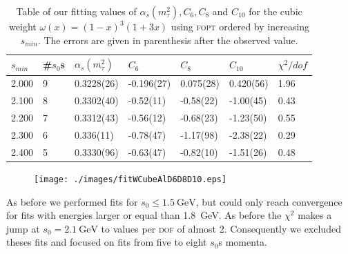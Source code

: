 \documentclass[../../index.tex]{subfiles}
\begin{document}
\begin{table}
  \centering
  \begin{tabular}{lllllll}
    \toprule
    \(s_{min}\) & \#\(s_0\)s & \(\alpha_s(m_\tau^2)\) & \(C_6\) & \(C_8\) & \(C_{10}\) & \(\chi^2/dof\)  \\
    \midrule
    2.000 & 9 & 0.3228(26) & -0.196(27) & 0.075(28) & 0.420(56) & 1.96 \\
    \rowcolor{primary}
    2.100 & 8 & 0.3302(40) & -0.52(11) & -0.58(22) & -1.00(45) & 0.43 \\
    \rowcolor{primary}
    2.200 & 7 & 0.3312(43) & -0.56(12) & -0.68(23) & -1.23(50) & 0.55 \\
    \rowcolor{primary}
    2.300 & 6 & 0.336(11) & -0.78(47) & -1.17(98) & -2.38(22) & 0.29 \\
    \rowcolor{primary}
    2.400 & 5 & 0.3330(96) & -0.63(47) & -0.82(10) & -1.51(26) & 0.48 \\
    \bottomrule
  \end{tabular}
  \caption{Table of our fitting values of \(\alpha_s(m_\tau^2), C_6, C_8\) and
    \(C_{10}\) for the cubic weight \(\omega(x)=(1-x)^3(1+3x)\) using
    \textsc{fopt} ordered by increasing \(s_{min}\). The errors are given in
    parenthesis after the observed value.}
  \label{table:fitWCubicAlD6D8D10}
\end{table}
\begin{figure}
  \centering \texttt{[image: ./images/fitWCubeAlD6D8D10.eps]}
  \label{fig:fitWCubeAlpha}
\end{figure}

As before we performed fits for \(s_0 \leq \SI{1.5}{\giga\eV}\), but could only
reach convergence for fits with energies larger or equal than
\SI{1.8}{\giga\eV}. As before the \(\chi^2\) makes a jump at
\(s_0=\SI{2.1}{\giga\eV}\) to values per \textsc{dof} of almost \(2\).
Consequently we excluded theses fits and focused on fits from five to eight
\(s_0\)s momenta.
\end{document}
